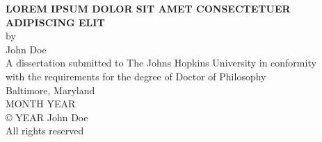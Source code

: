 \thispagestyle{empty}
\singlespacing   
\begin{center}
{\large \MakeUppercase{\textbf{Lorem ipsum dolor sit amet consectetuer adipiscing elit}}}
%
%
\\ \vspace{1in}             %
%
%
by \\
John Doe                    %
%
%
\\ \vspace{1.5in}           %
%
%
A dissertation submitted to The Johns Hopkins University in conformity\\
with the requirements for the degree of Doctor of Philosophy 
%
%
\\ \vspace{0.5in}           %
%
%
Baltimore, Maryland\\       %
MONTH YEAR                  %
%
%
\\ \vspace{2.75in}          %
%
%
{\copyright{} YEAR John Doe \\
All rights reserved}

\end{center}
